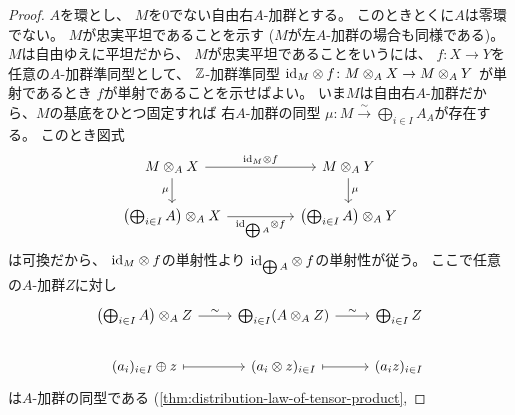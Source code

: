 \documentclass[report]{jlreq}
\begin{document}

\begin{proof}
    $A$を環とし、
    $M$を$0$でない自由右$A$-加群とする。
    このときとくに$A$は零環でない。
    $M$が忠実平坦であることを示す ($M$が左$A$-加群の場合も同様である)。
    $M$は自由ゆえに平坦だから、
    $M$が忠実平坦であることをいうには、
    $f \colon X \to Y$を任意の$A$-加群準同型として、
    $\mathbb{Z}$-加群準同型
    $\mathrm{id}_M \otimes f \colon M \otimes_A X \to M \otimes_A Y$
    が単射であるとき
    $f$が単射であることを示せばよい。
    いま$M$は自由右$A$-加群だから、$M$の基底をひとつ固定すれば
    右$A$-加群の同型
    $\mu \colon M \overset{\sim}{\to} \bigoplus_{i \in I} A_A$が存在する。
    このとき図式
    \begin{equation}
        \begin{tikzcd}[column sep=huge]
            M \otimes_A X
                \ar{r}{\id_M \otimes f}
                \ar{d}[swap]{\mu}
                & M \otimes_A Y
                    \ar{d}{\mu} \\
            \left(
                \bigoplus_{i \in I} A
            \right) \otimes_A X
                \ar{r}[swap]{\id_{\bigoplus A} \otimes f}
                & \left(
                    \bigoplus_{i \in I} A
                \right) \otimes_A Y
        \end{tikzcd}
    \end{equation}
    は可換だから、
    $\mathrm{id}_M \otimes f$の単射性より
    $\mathrm{id}_{\bigoplus A} \otimes f$の単射性が従う。
    ここで任意の$A$-加群$Z$に対し
    \begin{equation}
        \begin{tikzcd}
            \left(
                \bigoplus_{i \in I} A
            \right) \otimes_A Z
                \ar{r}{\sim}
                & \bigoplus_{i \in I}
                    (A \otimes_A Z)
                    \ar{r}{\sim}
                & \bigoplus_{i \in I} Z \\
            (a_i)_{i \in I} \oplus z
                \ar[mapsto]{r}
                & (a_i \otimes z)_{i \in I}
                    \ar[mapsto]{r}
                & (a_i z)_{i \in I}
        \end{tikzcd}
    \end{equation}
    は$A$-加群の同型である
    (\cref{thm:distribution-law-of-tensor-product},

\end{proof}
\end{document}

